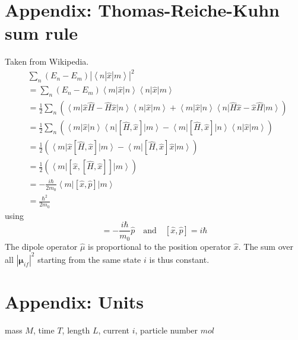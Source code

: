 \section{Appendix: Thomas-Reiche-Kuhn sum rule}

Taken from Wikipedia. 
%
\begin{align}
& \sum_n (E_n-E_m)\left|\left\langle n | \hat x | m \right\rangle\right|^2 \\
&= \sum_n (E_n-E_m) \left\langle m\right |\hat x\left | n\right\rangle\left\langle n \right| \hat{x}\left | m\right\rangle\\
%
&=\frac{1}{2}\sum_n\left(\left\langle m\right | \hat{x}\hat{H}-\hat{H}\hat{x}\left |n\right\rangle\left\langle n \right | \hat{x}\left | m\right\rangle + \left\langle m \right | \hat{x}\left | n\right\rangle\left\langle n\right | \hat{H}\hat{x}-\hat{x}\hat{H}\left |m\right\rangle \right)\\
%
&=\frac{1}{2}\sum_n \left(\left\langle m\right | \hat{x}\left |n \right\rangle\left\langle n\right | [\hat{H},\hat{x}]\left|m\right\rangle-\left\langle m \right | [\hat{H},\hat{x}]\left | n \right\rangle\left\langle n\right|\hat{x}\left| m \right\rangle \right)\\
%
&=\frac{1}{2}\left( \left\langle m\right | \hat{x}[\hat{H},\hat{x}]\left | m \right\rangle -\left\langle m\right | [\hat{H},\hat{x}]\hat{x}\left |m\right\rangle \right)\\
&=\frac{1}{2} \left( \left\langle m \right | [\hat{x},[\hat{H},\hat{x}]] \left | m \right\rangle \right)\\
%
&= -\frac{i\hbar}{2m_0}\left\langle m\right| [\hat{x},\hat{p}]\left| m \right\rangle\\
%
&= \frac{\hbar^2}{2m_0}
\end{align}
%
using
\begin{equation}
[\hat{H},\hat{x}]=-\frac{i\hbar}{m_0}\hat{p} \quad \text{and} \quad  [\hat{x},\hat{p}]=i\hbar
\end{equation}
The dipole operator $\hat{\mu}$ is proportional to the position operator $\hat{x}$. The sum over all $|\mathbf{\mu}_{if}|^2$ starting from the same state $i$ is thus constant.

\section{Appendix: Units }

mass $M$, time $T$, length $L$, current $i$, particle number $mol$

